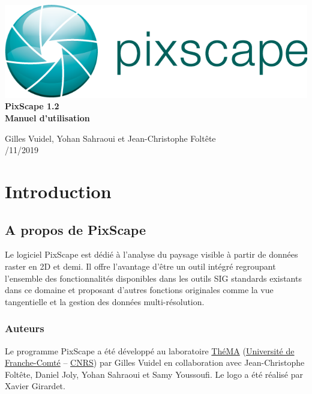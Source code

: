\documentclass{report}
\begin{document}
 \begin{titlepage}
	
	\centering
	\includegraphics[scale=0.5]{img/logo.png}\\
	
	\bigskip
	\bigskip
	\bigskip	
	{\Huge
		\bfseries
		PixScape 1.2\\
		\bigskip
		Manuel d’utilisation\\
	}
	\bigskip
	\bigskip
	\bigskip
	\bigskip
	\bigskip
	
	{\Large		
		Gilles Vuidel, Yohan Sahraoui et Jean-Christophe Foltête\\
		/11/2019\\
	}
	
\end{titlepage}

\setcounter{tocdepth}{2}
\tableofcontents

\pagebreak

\chapter{Introduction}

\section{A propos de PixScape}

Le logiciel PixScape est dédié à l'analyse du paysage visible à partir de données raster en 2D et demi. Il offre l’avantage d’être un outil intégré regroupant l’ensemble des fonctionnalités disponibles dans les outils SIG standards existants dans ce domaine et proposant d’autres fonctions originales comme la vue tangentielle et la gestion des données multi-résolution.


\subsection{Auteurs}
Le programme PixScape a été développé au laboratoire \href{http://thema.univ-fcomte.fr}{ThéMA} (\href{http://www.univ-fcomte.fr}{Université de Franche-Comté} – \href{http://www.cnrs.fr}{CNRS}) par Gilles Vuidel en collaboration avec Jean-Christophe Foltête, Daniel Joly, Yohan Sahraoui et Samy Youssoufi. Le logo a été réalisé par Xavier Girardet.
\end{document}
